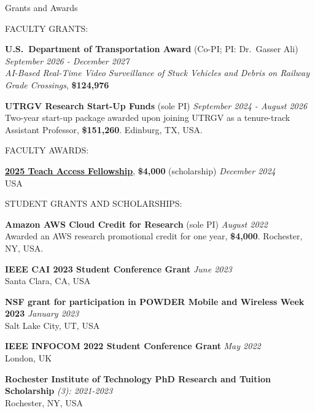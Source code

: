 \documentclass[10pt]{resume} %
\begin{document}
\begin{rSection}{Grants and Awards}

\item FACULTY GRANTS:

\textbf{U.S.\ Department of Transportation Award} (Co-PI; PI: Dr.\ Gasser Ali) \hfill {\em September 2026 - December 2027} \\
\textit{AI-Based Real-Time Video Surveillance of Stuck Vehicles and Debris on Railway Grade Crossings}, \textbf{\$124,976}

\vspace{-1mm}
\textbf{UTRGV Research Start-Up Funds} (sole PI) \hfill {\em September 2024 - August 2026} \\
Two-year start-up package awarded upon joining UTRGV as a tenure-track Assistant Professor, \textbf{\$151,260}. Edinburg, TX, USA.

\item FACULTY AWARDS:

\textbf{\href{https://teachaccess.org/teach-access-fellowship-program/}{2025 Teach Access Fellowship}}, \textbf{\$4,000} (scholarship) \hfill {\em December 2024} \\ USA

\item STUDENT GRANTS AND SCHOLARSHIPS:

\textbf{Amazon AWS Cloud Credit for Research} (sole PI) \hfill {\em August 2022} \\
Awarded an AWS research promotional credit for one year, \textbf{\$4,000}. Rochester, NY, USA.

\vspace{-1mm}
\textbf{IEEE CAI 2023 Student Conference Grant} \hfill {\em June 2023} \\ Santa Clara, CA, USA

\vspace{-1mm}
\textbf{NSF grant for participation in POWDER Mobile and Wireless Week 2023} \hfill {\em January 2023} \\
Salt Lake City, UT, USA

\vspace{-1mm}
\textbf{IEEE INFOCOM 2022 Student Conference Grant} \hfill {\em May 2022} \\
London, UK

\vspace{-1mm}
\textbf{Rochester Institute of Technology PhD Research and Tuition Scholarship} \hfill {\em (3): 2021-2023} \\
Rochester, NY, USA


\end{rSection}
\end{document}
